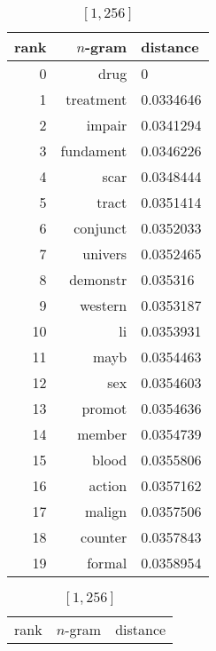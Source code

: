 \begin{table}[t]
    \begin{subtable}[t]{.45\textwidth}
        \centering
        \begin{tabularx}{\textwidth}{r R l}
            \toprule
            rank & $n$-gram & distance\\
            \midrule
            \num{0} & drug & \num{0}\\
            \num{1} & treatment & \num{0.0334646}\\
            \num{2} & impair & \num{0.0341294}\\
            \num{3} & fundament & \num{0.0346226}\\
            \num{4} & scar & \num{0.0348444}\\
            \num{5} & tract & \num{0.0351414}\\
            \num{6} & conjunct & \num{0.0352033}\\
            \num{7} & univers & \num{0.0352465}\\
            \num{8} & demonstr & \num{0.035316}\\
            \num{9} & western & \num{0.0353187}\\
            \num{10} & li & \num{0.0353931}\\
            \num{11} & mayb & \num{0.0354463}\\
            \num{12} & sex & \num{0.0354603}\\
            \num{13} & promot & \num{0.0354636}\\
            \midrule
            \num{14} & member & \num{0.0354739}\\
            \num{15} & blood & \num{0.0355806}\\
            \num{16} & action & \num{0.0357162}\\
            \num{17} & malign & \num{0.0357506}\\
            \num{18} & counter & \num{0.0357843}\\
            \num{19} & formal & \num{0.0358954}\\
            \bottomrule
        \end{tabularx}
        \caption{$[1,256]$}\label{tab:ranking_drug_all}
    \end{subtable}
    \hfill
    \begin{subtable}[t]{.45\textwidth}
        \centering
        \begin{tabularx}{\textwidth}{r R l}
            \toprule
            rank & $n$-gram & distance\\

\end{tabularx}
\end{subtable}
\end{table}
